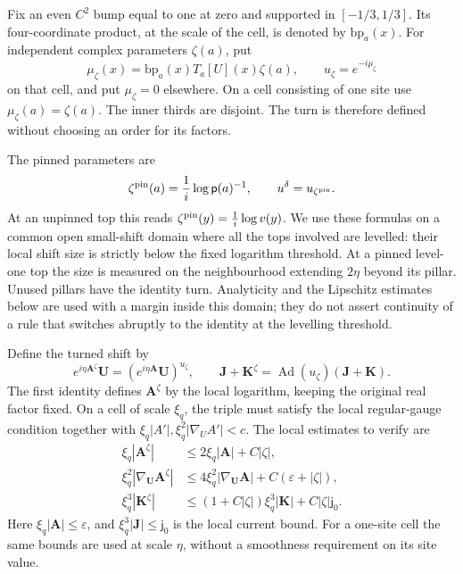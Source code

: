 \documentclass[11pt,letterpaper,reqno]{amsart}
\theoremstyle{definition}
\theoremstyle{remark}
\begin{document}
Fix an even \(C^2\) bump equal to one at zero and supported in
\([-1/3,1/3]\). Its four-coordinate product, at the scale of the
cell, is denoted by \(\mathrm{bp}_a(x)\). For independent complex
parameters \(\zeta(a)\), put
\begin{equation}\label{eq:xrg-turning-cells}
 \mu_\zeta(x)=\mathrm{bp}_a(x)T_a[U](x)\zeta(a),
       \qquad u_\zeta=e^{-i\mu_\zeta}
\end{equation}
on that cell, and put \(\mu_\zeta=0\) elsewhere. On a cell
consisting of one site use \(\mu_\zeta(a)=\zeta(a)\).
The inner thirds are disjoint. The turn is therefore defined
without choosing an order for its factors.

The pinned parameters are
\[
 \zeta^{\rm pin}(a)=\frac1i\log\mathsf p(a)^{-1},
          \qquad u^\delta=u_{\zeta^{\rm pin}}.
\]
At an unpinned top this reads
\(\zeta^{\rm pin}(y)=\frac1i\log v(y)\).
We use these formulas on a common open small-shift domain where
all the tops involved are levelled: their local shift size is
strictly below the fixed logarithm threshold. At a pinned
level-one top the size is measured on the neighbourhood extending
\(2\eta\) beyond its pillar. Unused pillars have the identity
turn. Analyticity and the Lipschitz estimates below are used with
a margin inside this domain; they do not assert continuity of a
rule that switches abruptly to the identity at the levelling
threshold.

Define the turned shift by
\begin{equation}\label{eq:xrg-turned-shift}
 e^{i\eta\mathbf A^\zeta}\mathbf U
           =(e^{i\eta\mathbf A}\mathbf U)^{u_\zeta},
 \qquad
 \mathbf J+\mathbf K^\zeta
           =\operatorname{Ad}(u_\zeta)(\mathbf J+\mathbf K).
\end{equation}
The first identity defines \(\mathbf A^\zeta\) by the local
logarithm, keeping the original real factor fixed.
On a cell of scale \(\xi_q\), the triple must satisfy the local
regular-gauge condition together with
\(\xi_q|A'|,\xi_q^2|\nabla_UA'|<c\). The local estimates to verify are
\begin{align*}
 \xi_q|\mathbf A^\zeta|
   &\le2\xi_q|\mathbf A|+C|\zeta|,\\
 \xi_q^2|\nabla_{\mathbf U}\mathbf A^\zeta|
   &\le4\xi_q^2|\nabla_{\mathbf U}\mathbf A|
                       +C(\varepsilon+|\zeta|),\\
 \xi_q^3|\mathbf K^\zeta|
   &\le(1+C|\zeta|)\xi_q^3|\mathbf K|
                                      +C|\zeta|\mathsf j_0.
\end{align*}
Here \(\xi_q|\mathbf A|\le\varepsilon\), and
\(\xi_q^3|\mathbf J|\le\mathsf j_0\) is the local current
bound. For a one-site cell the same bounds are used at scale
\(\eta\), without a smoothness requirement on its site value.
\end{document}
